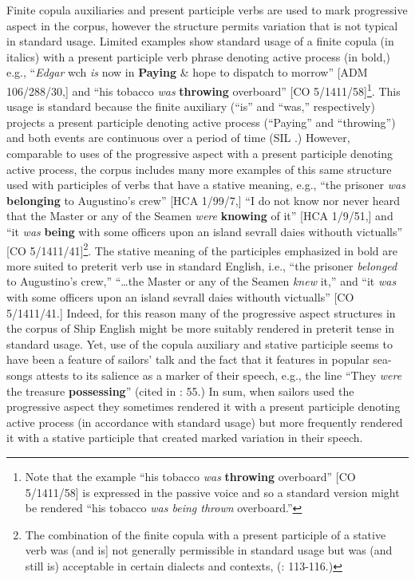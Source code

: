 Finite copula auxiliaries and present participle verbs are used to mark progressive aspect in the corpus, however the structure permits variation that is not typical in standard usage. Limited examples show standard usage of a finite copula (in italics) with a present participle verb phrase denoting active process (in bold,) e.g., “\textit{Edgar} wch \textit{is} now in \textbf{Paying} \& hope to dispatch to morrow” [ADM 106/288/30,] and “his tobacco \textit{was} \textbf{throwing} overboard” [CO 5/1411/58]\footnote{Note that the example “his tobacco \textit{was} \textbf{throwing} overboard” [CO 5/1411/58] is expressed in the passive voice and so a standard version might be rendered “his tobacco \textit{was being thrown} overboard.”}. This usage is standard because the finite auxiliary (“is” and “was,” respectively) projects a present participle denoting active process (“Paying” and “throwing”) and both events are continuous over a period of time (SIL \citealt{International2005}.) However, comparable to uses of the progressive aspect with a present participle denoting active process, the corpus includes many more examples of this same structure used with participles of verbs that have a stative meaning, e.g., “the prisoner \textit{was} \textbf{belonging} to Augustino’s crew” [HCA 1/99/7,] “I do not know nor never heard that the Master or any of the Seamen \textit{were} \textbf{knowing} of it” [HCA 1/9/51,] and “it \textit{was} \textbf{being} with some officers upon an island sevrall daies withouth victualls” [CO 5/1411/41]\footnote{The combination of the finite copula with a present participle of a stative verb was (and is] not generally permissible in standard usage but was (and still is) acceptable in certain dialects and contexts, (\citealt{Romer2005}: 113-116.)}. The stative meaning of the participles emphasized in bold are more suited to preterit verb use in standard English, i.e., “the prisoner \textit{belonged} to Augustino’s crew,” “…the Master or any of the Seamen \textit{knew} it,” and “it \textit{was} with some officers upon an island sevrall daies withouth victualls” [CO 5/1411/41.] Indeed, for this reason many of the progressive aspect structures in the corpus of Ship English might be more suitably rendered in preterit tense in standard usage. Yet, use of the copula auxiliary and stative participle seems to have been a feature of sailors’ talk and the fact that it features in popular sea-songs attests to its salience as a marker of their speech, e.g., the line “They \textit{were} the treasure \textbf{possessing}” (cited in \citealt{Palmer1986}: 55.) In sum, when sailors used the progressive aspect they sometimes rendered it with a present participle denoting active process (in accordance with standard usage) but more frequently rendered it with a stative participle that created marked variation in their speech. 

